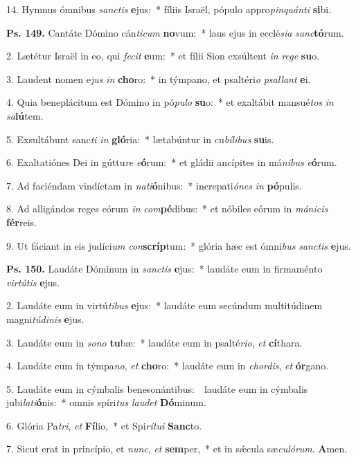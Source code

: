14. Hymnus ómnibus \textit{sanc}\textit{tis} \textbf{e}jus:~* fíliis Israël, pópulo appro\textit{pin}\textit{quán}\textit{ti} \textbf{si}bi.

\textbf{Ps. 149.} Cantáte Dómino cán\textit{ti}\textit{cum} \textbf{no}vum:~* laus ejus in ecclé\textit{si}\textit{a} \textit{sanc}\textbf{tó}rum.

2. Lætétur Israël in eo, qui \textit{fe}\textit{cit} \textbf{e}um:~* et fílii Sion exsúltent \textit{in} \textit{re}\textit{ge} \textbf{su}o.

3. Laudent nomen e\textit{jus} \textit{in} \textbf{cho}ro:~* in týmpano, et psaltéri\textit{o} \textit{psal}\textit{lant} \textbf{e}i.

4. Quia beneplácitum est Dómino in pó\textit{pu}\textit{lo} \textbf{su}o:~* et exaltábit mansué\textit{tos} \textit{in} \textit{sa}\textbf{lú}tem.

5. Exsultábunt sanc\textit{ti} \textit{in} \textbf{gló}ria:~* lætabúntur in cu\textit{bí}\textit{li}\textit{bus} \textbf{su}is.

6. Exaltatiónes Dei in gúttu\textit{re} \textit{e}\textbf{ó}rum:~* et gládii ancípites in má\textit{ni}\textit{bus} \textit{e}\textbf{ó}rum.

7. Ad faciéndam vindíctam in \textit{na}\textit{ti}\textbf{ó}nibus:~* increpati\textit{ó}\textit{nes} \textit{in} \textbf{pó}pulis.

8. Ad alligándos reges eórum \textit{in} \textit{com}\textbf{pé}dibus:~* et nóbiles eórum in \textit{má}\textit{ni}\textit{cis} \textbf{fér}reis.

9. Ut fáciant in eis judíci\textit{um} \textit{con}\textbf{scríp}tum:~* glória hæc est ómni\textit{bus} \textit{sanc}\textit{tis} \textbf{e}jus.

\textbf{Ps. 150.} Laudáte Dóminum in \textit{sanc}\textit{tis} \textbf{e}jus:~* laudáte eum in firmaménto \textit{vir}\textit{tú}\textit{tis} \textbf{e}jus.

2. Laudáte eum in virtú\textit{ti}\textit{bus} \textbf{e}jus:~* laudáte eum secúndum multitúdinem magni\textit{tú}\textit{di}\textit{nis} \textbf{e}jus.

3. Laudáte eum in \textit{so}\textit{no} \textbf{tu}bæ:~* laudáte eum in psalté\textit{ri}\textit{o}, \textit{et} \textbf{cí}thara.

4. Laudáte eum in týmpa\textit{no}, \textit{et} \textbf{cho}ro:~* laudáte eum in \textit{chor}\textit{dis}, \textit{et} \textbf{ór}gano.

5. Laudáte eum in cýmbalis benesonántibus:~\GreDagger\ laudáte eum in cýmbalis jubi\textit{la}\textit{ti}\textbf{ó}nis:~* omnis spíri\textit{tus} \textit{lau}\textit{det} \textbf{Dó}minum.

6. Glória Pa\textit{tri}, \textit{et} \textbf{Fí}lio,~* et Spi\textit{rí}\textit{tu}\textit{i} \textbf{Sanc}to.

7. Sicut erat in princípio, et \textit{nunc}, \textit{et} \textbf{sem}per,~* et in s\'{\ae}cula sæ\textit{cu}\textit{ló}\textit{rum}. \textbf{A}men.